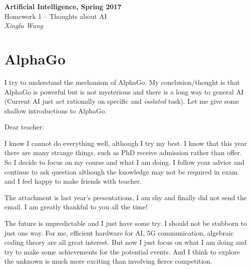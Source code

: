 \documentclass{mcmthesis}
\begin{document}
\begin{center}
	\textbf{\LARGE{Artificial Intelligence, Spring 2017}} \\
	\vspace{0.2em}
	\large{Homework 1 -- Thoughts about AI} \\
	\vspace{1em}
	{\itshape Xinglu Wang}  
\end{center}
\section{AlphaGo}\label{sec1}
I try to understand the mechanism of AlphaGo\cite{1}. My conclusion/thought is that AlphaGo is powerful but is not mysterious and there is a long way to general AI (Current AI just  act rationally on specific and \textit{isolated} task). Let me give some shallow introductions to AlphaGo.

Dear teacher:

I know I cannot do everything well, although I try my best. I know that this year there are many strange things, such as PhD receive admission rather than offer. So I decide to focus on my course and what I am doing. I follow your advice and continue to ask question although the knowledge may not be required in exam and I feel happy to make friends with teacher. 

The attachment is last year's presentations, I am shy and finally did not send the email. I am greatly thankful to you all the time!

The future is unpredictable and I just have some try. I should not be stubborn to just one way. For me, efficient hardware for AI, 5G communication, algebraic coding theory are all great interest. But now I just focus on what I am doing and try to make some achievements for the potential events. And I think to explore the unknown is much more exciting than involving fierce competition. 
\end{document}
